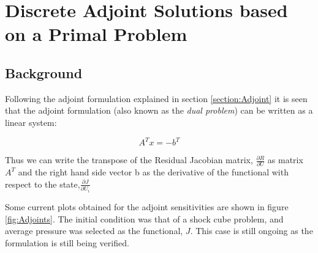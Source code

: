 \section{Discrete Adjoint Solutions based on a Primal Problem}
\label{section:Discrete_Adjoint}
\subsection{Background}

Following the adjoint formulation explained in section \ref{section:Adjoint} it is seen that the adjoint formulation (also known as the \textit{dual problem}) can be written as a linear system:

\begin{equation}
A^Tx = -b^T
\end{equation}

Thus we can write the transpose of the Residual Jacobian matrix, $\frac{\partial{R}}{\partial{U}}$ as matrix $A^T$ and the right hand side vector b as the derivative of the functional with respect to the state,$\frac{\partial{J}}{\partial{U_i}}$\par

Some current plots obtained for the adjoint sensitivities are shown in figure \ref{fig:Adjoints}. The initial condition was that of a shock cube problem, and average pressure was selected as the functional, $J$. This case is still ongoing as the formulation is still being verified.\par

